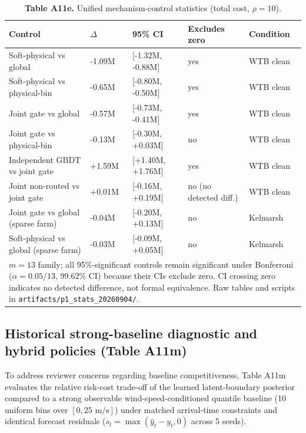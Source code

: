 \documentclass[
  journal]{IEEEtran}
\begin{document}
\begin{table}[!t]
\centering
\fontsize{8.0pt}{9.6pt}\selectfont
\setlength{\tabcolsep}{2.0pt}
\renewcommand{\arraystretch}{1.05}
\caption*{\textbf{Table A11e.} Unified mechanism-control statistics (total cost, $\rho=10$).}
%
\begin{tabular}{lllll}
\toprule
Control & $\Delta$ & 95\% CI & Excludes zero & Condition \\
\midrule
Soft-physical vs global & -1.09M & [-1.32M, -0.88M] & yes & WTB clean \\
Soft-physical vs physical-bin & -0.65M & [-0.80M, -0.50M] & yes & WTB clean \\
Joint gate vs global & -0.57M & [-0.73M, -0.41M] & yes & WTB clean \\
Joint gate vs physical-bin & -0.13M & [-0.30M, +0.03M] & no & WTB clean \\
Independent GBDT vs joint gate & +1.59M & [+1.40M, +1.76M] & yes & WTB clean \\
Joint non-routed vs joint gate & +0.01M & [-0.16M, +0.19M] & no (no detected diff.) & WTB clean \\
Joint gate vs global (sparse farm) & -0.04M & [-0.20M, +0.13M] & no & Kelmarsh \\
Soft-physical vs global (sparse farm) & -0.03M & [-0.09M, +0.05M] & no & Kelmarsh \\
\midrule
\multicolumn{5}{p{0.96\columnwidth}}{\fontsize{8.0pt}{9.6pt}\selectfont $m=13$ family; all 95\%-significant controls remain significant under Bonferroni ($\alpha=0.05/13$, 99.62\% CI) because their CIs exclude zero. CI crossing zero indicates no detected difference, not formal equivalence. Raw tables and scripts in \texttt{artifacts/p1\_stats\_20260904/}.} \\
\bottomrule
\end{tabular}
\end{table}

\FloatBarrier

\subsection*{Historical strong-baseline diagnostic and hybrid policies
(Table
A11m)}\label{historical-strong-baseline-diagnostic-and-hybrid-policies-table-a11m}

To address reviewer concerns regarding baseline competitiveness, Table
A11m evaluates the relative risk-cost trade-off of the learned
latent-boundary posterior compared to a strong observable
wind-speed-conditioned quantile baseline (10 uniform bins over
\([0, 25\text{ m/s}]\)) under matched arrival-time constraints and
identical forecast residuals (\(s_t = \max(\hat{y}_t - y_t, 0)\) across
5 seeds).
\end{document}
